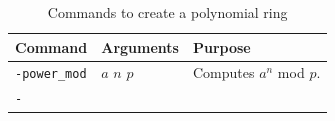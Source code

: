 \begin{table}
\begin{center}
\begin{tabular}{|p{4cm}|p{3cm}|p{7cm}|}
\hline
Command & Arguments & Purpose \\
\hline
\hline
\verb'-power_mod' & $a$ $n$ $p$ & Computes $a^n$ mod $p$. \\
\hline
\verb'-' &  &  \\
\hline
\end{tabular}
\end{center}
\caption{\label{tab:polynomial:ring}Commands to create a polynomial ring}
\end{table}


